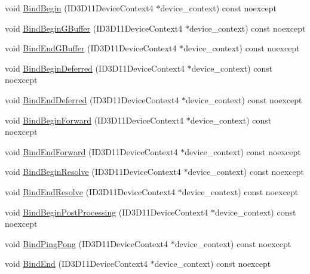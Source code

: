 \begin{DoxyCompactItemize}
void \hyperlink{classmage_1_1_rendering_output_manager_aca82046ea30351c98e652571fef0ebf3}{Bind\+Begin} (I\+D3\+D11\+Device\+Context4 $\ast$device\+\_\+context) const noexcept
\item 
void \hyperlink{classmage_1_1_rendering_output_manager_aaf66f4a405ed9e8ab54474620bc9aef9}{Bind\+Begin\+G\+Buffer} (I\+D3\+D11\+Device\+Context4 $\ast$device\+\_\+context) const noexcept
\item 
void \hyperlink{classmage_1_1_rendering_output_manager_a40e30533e1145586469121117c15b42a}{Bind\+End\+G\+Buffer} (I\+D3\+D11\+Device\+Context4 $\ast$device\+\_\+context) const noexcept
\item 
void \hyperlink{classmage_1_1_rendering_output_manager_ae9fa2b0bfe9e8d935d5dc99288acaf78}{Bind\+Begin\+Deferred} (I\+D3\+D11\+Device\+Context4 $\ast$device\+\_\+context) const noexcept
\item 
void \hyperlink{classmage_1_1_rendering_output_manager_a18bd478dd015a66f4874116f243da37a}{Bind\+End\+Deferred} (I\+D3\+D11\+Device\+Context4 $\ast$device\+\_\+context) const noexcept
\item 
void \hyperlink{classmage_1_1_rendering_output_manager_aaedc2fef9e4b69da6dcd264609225420}{Bind\+Begin\+Forward} (I\+D3\+D11\+Device\+Context4 $\ast$device\+\_\+context) const noexcept
\item 
void \hyperlink{classmage_1_1_rendering_output_manager_ac9fc0758bcd83db7ae24641d4fd38273}{Bind\+End\+Forward} (I\+D3\+D11\+Device\+Context4 $\ast$device\+\_\+context) const noexcept
\item 
void \hyperlink{classmage_1_1_rendering_output_manager_a68c24a526a6a7dba7875f66152b73b3f}{Bind\+Begin\+Resolve} (I\+D3\+D11\+Device\+Context4 $\ast$device\+\_\+context) const noexcept
\item 
void \hyperlink{classmage_1_1_rendering_output_manager_a406c918e63032968a5c82f7ae7d39606}{Bind\+End\+Resolve} (I\+D3\+D11\+Device\+Context4 $\ast$device\+\_\+context) const noexcept
\item 
void \hyperlink{classmage_1_1_rendering_output_manager_acf03c6d085d822713e52dec49ef99595}{Bind\+Begin\+Post\+Processing} (I\+D3\+D11\+Device\+Context4 $\ast$device\+\_\+context) const noexcept
\item 
void \hyperlink{classmage_1_1_rendering_output_manager_a3e35046ac247c08aab2a9631b1beef7d}{Bind\+Ping\+Pong} (I\+D3\+D11\+Device\+Context4 $\ast$device\+\_\+context) const noexcept
\item 
void \hyperlink{classmage_1_1_rendering_output_manager_a212a0ec7330f52dbe30f87bebccb0c8e}{Bind\+End} (I\+D3\+D11\+Device\+Context4 $\ast$device\+\_\+context) const noexcept
\end{DoxyCompactItemize}
